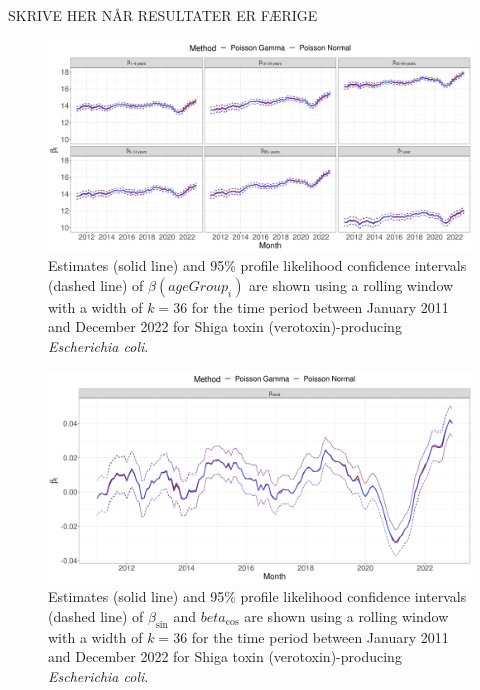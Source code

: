\documentclass[a4paper,twoside,11pt]{report} %
\theoremstyle{definition}
\theoremstyle{definition}
\theoremstyle{definition}
\theoremstyle{definition}
\theoremstyle{remark}
\begin{document}
SKRIVE HER NÅR RESULTATER ER FÆRIGE



\begin{figure}[H]
\includegraphics[width=1\linewidth]{../figures/STEC_novel_par_ageGroup} \caption{Estimates (solid line) and 95\% profile likelihood confidence intervals (dashed line) of \(\beta(ageGroup_i)\) are shown using a rolling window with a width of \(k=36\) for the time period between January 2011 and December 2022 for Shiga toxin (verotoxin)-producing \textit{Escherichia coli}.}\label{fig:STECnovelparageGroup}
\end{figure}



\begin{figure}[H]
\includegraphics[width=1\linewidth]{../figures/STEC_novel_par_trend} \caption{Estimates (solid line) and 95\% profile likelihood confidence intervals (dashed line) of \(\beta_{\sin}\) and \(beta_{\cos}\) are shown using a rolling window with a width of \(k=36\) for the time period between January 2011 and December 2022 for Shiga toxin (verotoxin)-producing \textit{Escherichia coli}.}\label{fig:STECnovelpartrend}
\end{figure}
\end{document}
